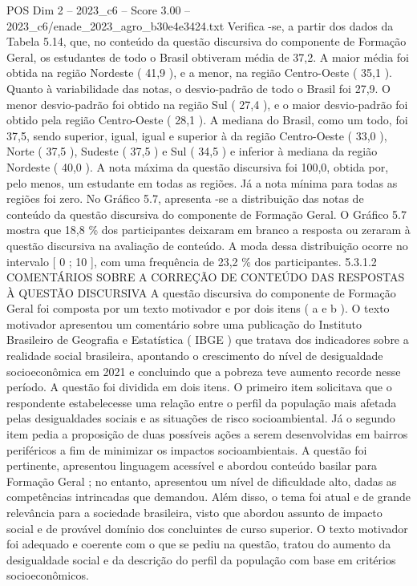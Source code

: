 \begin{textsample}{POS Dim 2 – 2023\_c6 – Score 3.00 – 2023\_c6/enade\_2023\_agro\_b30e4e3424.txt}
Verifica -se, a partir dos dados da Tabela 5.14, que, no conteúdo da questão discursiva do componente de Formação Geral, os estudantes de todo o Brasil obtiveram média de 37,2.
A maior média foi obtida na região Nordeste ( 41,9 ), e a menor, na região Centro-Oeste ( 35,1 ).
Quanto à variabilidade das notas, o desvio-padrão de todo o Brasil foi 27,9.
O menor desvio-padrão foi obtido na região Sul ( 27,4 ), e o maior desvio-padrão foi obtido pela região Centro-Oeste ( 28,1 ).
A mediana do Brasil, como um todo, foi 37,5, sendo superior, igual, igual e superior à da região Centro-Oeste ( 33,0 ), Norte ( 37,5 ), Sudeste ( 37,5 ) e Sul ( 34,5 ) e inferior à mediana da região Nordeste ( 40,0 ).
A nota máxima da questão discursiva foi 100,0, obtida por, pelo menos, um estudante em todas as regiões.
Já a nota mínima para todas as regiões foi zero.
No Gráfico 5.7, apresenta -se a distribuição das notas de conteúdo da questão discursiva do componente de Formação Geral.
O Gráfico 5.7 mostra que 18,8 \% dos participantes deixaram em branco a resposta ou zeraram à questão discursiva na avaliação de conteúdo.
A moda dessa distribuição ocorre no intervalo [ 0 ; 10 ], com uma frequência de 23,2 \% dos participantes. 5.3.1.2 COMENTÁRIOS SOBRE A CORREÇÃO DE CONTEÚDO DAS RESPOSTAS À QUESTÃO DISCURSIVA A questão discursiva do componente de Formação Geral foi composta por um texto motivador e por dois itens ( a e b ).
O texto motivador apresentou um comentário sobre uma publicação do Instituto Brasileiro de Geografia e Estatística ( IBGE ) que tratava dos indicadores sobre a realidade social brasileira, apontando o crescimento do nível de desigualdade socioeconômica em 2021 e concluindo que a pobreza teve aumento recorde nesse período.
A questão foi dividida em dois itens.
O primeiro item solicitava que o respondente estabelecesse uma relação entre o perfil da população mais afetada pelas desigualdades sociais e as situações de risco socioambiental.
Já o segundo item pedia a proposição de duas possíveis ações a serem desenvolvidas em bairros periféricos a fim de minimizar os impactos socioambientais.
A questão foi pertinente, apresentou linguagem acessível e abordou conteúdo basilar para Formação Geral ; no entanto, apresentou um nível de dificuldade alto, dadas as competências intrincadas que demandou.
Além disso, o tema foi atual e de grande relevância para a sociedade brasileira, visto que abordou assunto de impacto social e de provável domínio dos concluintes de curso superior.
O texto motivador foi adequado e coerente com o que se pediu na questão, tratou do aumento da desigualdade social e da descrição do perfil da população com base em critérios socioeconômicos.

\end{textsample}
